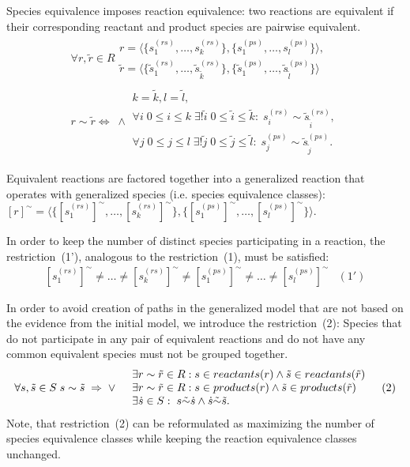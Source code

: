 \documentclass[9pt]{article}
\newcounter{rm}
\begin{document}
Species equivalence imposes reaction equivalence: two reactions are equivalent if their corresponding reactant and product species are pairwise equivalent.
\[ \begin{array}{l}
\mbox{$\forall r, \tilde{r} \in R $} \begin{array}{c}
	\mbox{$r = \langle\{s^{(rs)}_1, \ldots, s^{(rs)}_k\},\{s^{(ps)}_1, \ldots, s^{(ps)}_l\}\rangle,$}\\
	\mbox{$\tilde{r} = \langle\{\tilde{s}^{(rs)}_1, \ldots, \tilde{s}^{(rs)}_{\tilde{k}}\},\{\tilde{s}^{(ps)}_1, \ldots, \tilde{s}^{(ps)}_{\tilde{l}}\}\rangle$}
\end{array}\\ 
\mbox{$r \sim \tilde{r} \iff \; \land$} \begin{array}{l}
	\mbox{$k = \tilde{k}, l = \tilde{l}$}, \\
	\mbox{$\forall i\; 0\leq{i}\leq{k} \; \exists{!} \tilde{i}\; 0\leq \tilde{i}\leq \tilde{k}:\; s^{(rs)}_i \sim \tilde{s}^{(rs)}_{\tilde{i}}$}, \\
	\mbox{$\forall j\;0\leq j\leq l\;\exists{!} \tilde{j}\;0\leq \tilde{j}\leq\tilde{l}:\;s^{(ps)}_j \sim \tilde{s}^{(ps)}_{\tilde{j}}$}.
\end{array}	 
\end{array} \]

Equivalent reactions are factored together into a generalized reaction that operates with generalized species (i.e. species equivalence classes): 
$[r]^{\sim} = \langle\{[s^{(rs)}_1]^{\sim}, \ldots, [s^{(rs)}_k]^{\sim}\}, \{[s^{(ps)}_1]^{\sim}, \ldots, [s^{(ps)}_l]^{\sim}\}\rangle$.

In order to keep the number of distinct species participating in a reaction, the restriction~(1'), analogous to the restriction~(1), must be satisfied:
\[ \begin{array}{lr}
\mbox{$[s^{(rs)}_1]^{\sim} \neq \ldots \neq [s^{(rs)}_k]^{\sim} \neq [s^{(ps)}_1]^{\sim} \neq \ldots \neq [s^{(ps)}_l]^{\sim}$} & (1')
\end{array} \]

In order to avoid creation of paths in the generalized model that are not based on the evidence from the initial model, we introduce the restriction~(2): Species that do not participate in any pair of equivalent reactions and do not have any common equivalent species must not be grouped together.
\[ \begin{array}{clr}
\mbox{$\forall s, \tilde{s} \in S\; s \sim \tilde{s} \;\Rightarrow\;\lor$} & 
\begin{array}{l}
	\mbox{$\exists r \sim \tilde{r} \in R: s \in reactants(r) \land \tilde{s} \in reactants(\tilde{r})$} \\
	\mbox{$\exists r \sim \tilde{r} \in R: s \in products(r) \land \tilde{s} \in products(\tilde{r})$} \\
	\mbox{$ \exists \dot{s} \in S:\; s \tilde{\sim} \dot{s} \land \dot{s} \tilde{\sim} \tilde{s}$}.
\end{array} & (2)
\end{array} \]
Note, that restriction~(2) can be reformulated as maximizing the number of species equivalence classes while keeping the reaction equivalence classes unchanged. 
\end{document}
